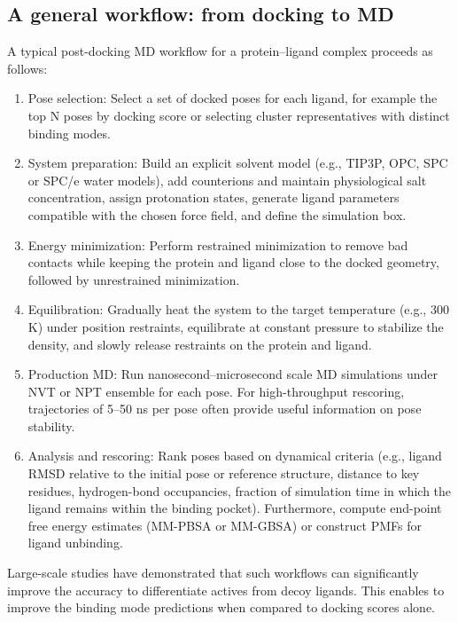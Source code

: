 \documentclass[12pt]{article}
\begin{document}
\subsection{A general workflow: from docking to MD}

A typical post-docking MD workflow for a protein--ligand complex proceeds as follows:

\begin{enumerate}
\item Pose selection: Select a set of docked poses for each ligand, for example the top N poses by docking score or selecting cluster representatives with distinct binding modes.

\item System preparation: Build an explicit solvent model (e.g., TIP3P, OPC, SPC or SPC/e water models), add counterions and maintain physiological salt concentration, assign protonation states, generate ligand parameters compatible with the chosen force field, and define the simulation box.

\item Energy minimization: Perform restrained minimization to remove bad contacts while keeping the protein and ligand close to the docked geometry, followed by unrestrained minimization.

\item Equilibration: Gradually heat the system to the target temperature (e.g., 300 K) under position restraints, equilibrate at constant pressure to stabilize the density, and slowly release restraints on the protein and ligand.

\item Production MD: Run nanosecond--microsecond scale MD simulations under NVT or NPT ensemble for each pose. For high-throughput rescoring, trajectories of 5--50 ns per pose often provide useful information on pose stability.

\item Analysis and rescoring: Rank poses based on dynamical criteria (e.g., ligand RMSD relative to the initial pose or reference structure, distance to key residues, hydrogen-bond occupancies, fraction of simulation time in which the ligand remains within the binding pocket). Furthermore, compute end-point free energy estimates (MM-PBSA or MM-GBSA) or construct PMFs for ligand unbinding.
\end{enumerate}

Large-scale studies have demonstrated that such workflows can significantly improve the accuracy to differentiate actives from decoy ligands. This enables to improve the binding mode predictions when compared to docking scores alone.\cite{CH9_Cournia2017,CH9_guterres2020}
\end{document}

